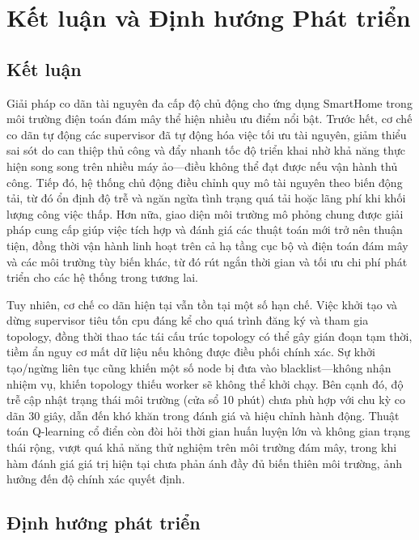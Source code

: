 \chapter{Kết luận và Định hướng Phát triển}

\section{Kết luận}

Giải pháp co dãn tài nguyên đa cấp độ chủ động cho ứng dụng SmartHome trong môi trường điện toán đám mây thể hiện nhiều ưu điểm nổi bật. Trước hết, cơ chế co dãn tự động các supervisor đã tự động hóa việc tối ưu tài nguyên, giảm thiểu sai sót do can thiệp thủ công và đẩy nhanh tốc độ triển khai nhờ khả năng thực hiện song song trên nhiều máy ảo—điều không thể đạt được nếu vận hành thủ công. Tiếp đó, hệ thống chủ động điều chỉnh quy mô tài nguyên theo biến động tải, từ đó ổn định độ trễ và ngăn ngừa tình trạng quá tải hoặc lãng phí khi khối lượng công việc thấp. Hơn nữa, giao diện môi trường mô phỏng chung được giải pháp cung cấp giúp việc tích hợp và đánh giá các thuật toán mới trở nên thuận tiện, đồng thời vận hành linh hoạt trên cả hạ tầng cục bộ và điện toán đám mây và các môi trường tùy biến khác, từ đó rút ngắn thời gian và tối ưu chi phí phát triển cho các hệ thống trong tương lai.

Tuy nhiên, cơ chế co dãn hiện tại vẫn tồn tại một số hạn chế. Việc khởi tạo và dừng supervisor tiêu tốn \gls{cpu} đáng kể cho quá trình đăng ký và tham gia topology, đồng thời thao tác tái cấu trúc topology có thể gây gián đoạn tạm thời, tiềm ẩn nguy cơ mất dữ liệu nếu không được điều phối chính xác. Sự khởi tạo/ngừng liên tục cũng khiến một số node bị đưa vào blacklist—không nhận nhiệm vụ, khiến topology thiếu worker sẽ không thể khởi chạy. Bên cạnh đó, độ trễ cập nhật trạng thái môi trường (cửa sổ 10 phút) chưa phù hợp với chu kỳ co dãn 30 giây, dẫn đến khó khăn trong đánh giá và hiệu chỉnh hành động. Thuật toán Q-learning cổ điển còn đòi hỏi thời gian huấn luyện lớn và không gian trạng thái rộng, vượt quá khả năng thử nghiệm trên môi trường đám mây, trong khi hàm đánh giá giá trị hiện tại chưa phản ánh đầy đủ biến thiên môi trường, ảnh hưởng đến độ chính xác quyết định.

\section{Định hướng phát triển}

